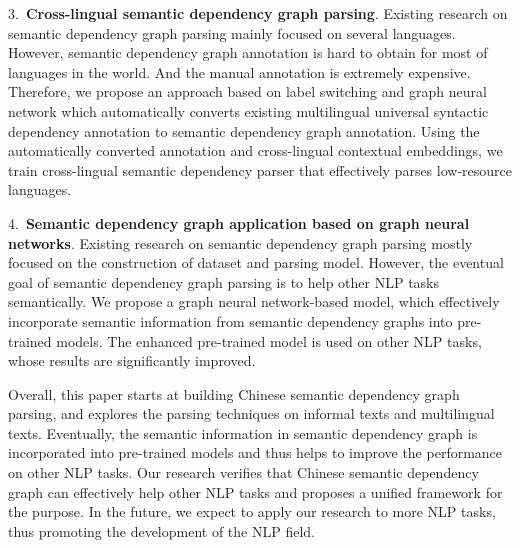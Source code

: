 \begin{eabstract}
3.\ \textbf{Cross-lingual semantic dependency graph parsing}. 
Existing research on semantic dependency graph parsing mainly focused on several languages. 
However, semantic dependency graph annotation is hard to obtain for most of languages in the world. 
And the manual annotation is extremely expensive. 
Therefore, we propose an approach based on label switching and graph neural network which automatically converts existing multilingual universal syntactic dependency annotation to semantic dependency graph annotation. 
Using the automatically converted annotation and cross-lingual contextual embeddings, we train cross-lingual semantic dependency parser that effectively parses low-resource languages. 

4.\ \textbf{Semantic dependency graph application based on graph neural networks}. 
Existing research on semantic dependency graph parsing mostly focused on the construction of dataset and parsing model. 
However, the eventual goal of semantic dependency graph parsing is to help other NLP tasks semantically. 
We propose a graph neural network-based model, which effectively incorporate semantic information from semantic dependency graphs into pre-trained models. 
The enhanced pre-trained model is used on other NLP tasks, whose results are significantly improved. 

Overall, this paper starts at building Chinese semantic dependency graph parsing, and explores the parsing techniques on informal texts and multilingual texts. 
Eventually, the semantic information in semantic dependency graph is incorporated into pre-trained models and thus helps to improve the performance on other NLP tasks. 
Our research verifies that Chinese semantic dependency graph can effectively help other NLP tasks and proposes a unified framework for the purpose. 
In the future, we expect to apply our research to more NLP tasks, thus promoting the development of the NLP field. 


\end{eabstract}
